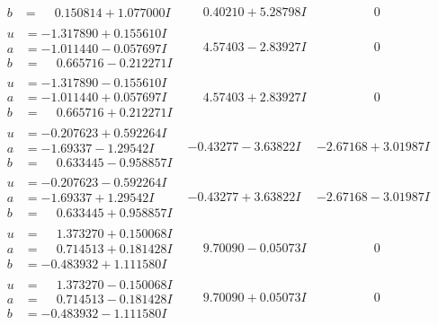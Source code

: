 \documentclass[1p]{elsarticle_modified}
\theoremstyle{definition}
\begin{document}
$$\begin{array}{c|c|c}
\begin{aligned}
b &= \phantom{-}0.150814 + 1.077000 I\end{aligned}
 & \phantom{-}0.40210 + 5.28798 I & \phantom{-0.000000 } 0 \\ \hline\begin{aligned}
u &= -1.317890 + 0.155610 I \\
a &= -1.011440 - 0.057697 I \\
b &= \phantom{-}0.665716 - 0.212271 I\end{aligned}
 & \phantom{-}4.57403 - 2.83927 I & \phantom{-0.000000 } 0 \\ \hline\begin{aligned}
u &= -1.317890 - 0.155610 I \\
a &= -1.011440 + 0.057697 I \\
b &= \phantom{-}0.665716 + 0.212271 I\end{aligned}
 & \phantom{-}4.57403 + 2.83927 I & \phantom{-0.000000 } 0 \\ \hline\begin{aligned}
u &= -0.207623 + 0.592264 I \\
a &= -1.69337 - 1.29542 I \\
b &= \phantom{-}0.633445 - 0.958857 I\end{aligned}
 & -0.43277 - 3.63822 I & -2.67168 + 3.01987 I \\ \hline\begin{aligned}
u &= -0.207623 - 0.592264 I \\
a &= -1.69337 + 1.29542 I \\
b &= \phantom{-}0.633445 + 0.958857 I\end{aligned}
 & -0.43277 + 3.63822 I & -2.67168 - 3.01987 I \\ \hline\begin{aligned}
u &= \phantom{-}1.373270 + 0.150068 I \\
a &= \phantom{-}0.714513 + 0.181428 I \\
b &= -0.483932 + 1.111580 I\end{aligned}
 & \phantom{-}9.70090 - 0.05073 I & \phantom{-0.000000 } 0 \\ \hline\begin{aligned}
u &= \phantom{-}1.373270 - 0.150068 I \\
a &= \phantom{-}0.714513 - 0.181428 I \\
b &= -0.483932 - 1.111580 I\end{aligned}
 & \phantom{-}9.70090 + 0.05073 I & \phantom{-0.000000 } 0 \\ \hline\begin{aligned}

\end{aligned}
\end{array}$$
\end{document}
